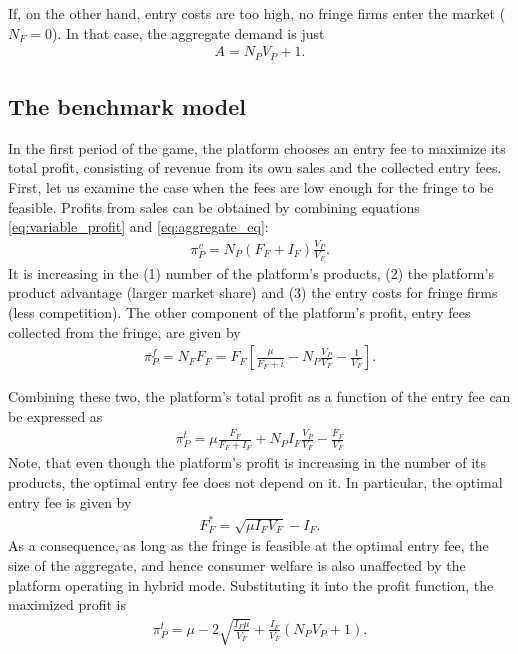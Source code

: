 \documentclass[a4paper]{article}
\begin{document}
If, on the other hand, entry costs are too high, no fringe firms enter the market ($N_F = 0$).
In that case, the aggregate demand is just
\begin{align*}
    A = N_P V_P + 1.
\end{align*}

\subsection{The benchmark model}

In the first period of the game, the platform chooses an entry fee to maximize its total profit, consisting of revenue from its own sales and the collected entry fees.
First, let us examine the case when the fees are low enough for the fringe to be feasible.
Profits from sales can be obtained by combining equations \eqref{eq:variable_profit} and \eqref{eq:aggregate_eq}:
\begin{align*}
    \pi_P^{v} = N_P (F_F + I_F) \frac{V_P}{V_F}.
\end{align*}
It is increasing in the (1) number of the platform's products, (2) the platform's product advantage (larger market share) and (3) the entry costs for fringe firms (less competition).
The other component of the platform's profit, entry fees collected from the fringe, are given by
\begin{align*}
    \pi_P^{f} = N_F F_F = F_F \left[ \frac{\mu}{F_F + i} - N_P \frac{V_P}{V_F} - \frac{1}{V_F} \right].
\end{align*}

Combining these two, the platform's total profit as a function of the entry fee can be expressed as
\begin{align}
    \pi_P^{t} = \mu\frac{F_F}{F_F + I_F} + N_P I_F \frac{V_P}{V_F} - \frac{F_F}{V_F}
    \label{eq:hybrid_profit}
\end{align}
Note, that even though the platform's profit is increasing in the number of its products, the optimal entry fee does not depend on it.
In particular, the optimal entry fee is given by
\begin{align*}
    F_F^* = \sqrt{\mu I_F V_F} - I_F.
\end{align*}
As a consequence, as long as the fringe is feasible at the optimal entry fee, the size of the aggregate, and hence consumer welfare is also unaffected by the platform operating in hybrid mode.
Substituting it into the profit function, the maximized profit is
\begin{align*}
    \pi_P^{t} = \mu - 2\sqrt{\frac{I_F \mu}{V_F}} + \frac{I_F}{V_F} (N_P V_P + 1).
\end{align*}
\end{document}
